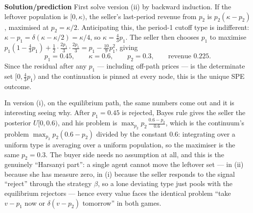 \documentclass[12pt]{article}
\begin{document}
\begin{center}
\end{center}


\textbf{Solution/prediction} 
First solve version (ii) by backward induction. If the leftover population is
$[0,\kappa)$, the seller's last-period revenue from $p_2$ is $p_2(\kappa - p_2)$, maximised at $p_2 = \kappa/2$. Anticipating this, the period-1 cutoff type is indifferent: $\kappa - p_1 = \delta(\kappa - \kappa/2) = \kappa/4$, so $\kappa = \tfrac43 p_1$. The seller then chooses $p_1$ to maximise $p_1(1 - \tfrac43 p_1) + \tfrac12 \cdot \tfrac{2p_1}{3}\cdot \tfrac{2p_1}{3} = p_1 - \tfrac{10}{9}p_1^2$, giving
\[ p_1 = 0.45, \qquad \kappa = 0.6, \qquad p_2 = 0.3, \qquad
\text{revenue } 0.225.
\]
Since the residual after any $p_1$ --- including off-path prices --- is the
determinate set $[0, \tfrac43 p_1)$ and the continuation is pinned at every
node, this is the unique SPE outcome.
 
In version (i), on the equilibrium path, the same numbers come out and it is
interesting seeing why. After $p_1 = 0.45$ is rejected, Bayes rule gives the seller
the posterior $U[0, 0.6)$, and his problem is $\max_{p_2} p_2\,\frac{0.6 - p_2}{0.6}$, which is the continuum's problem $\max_{p_2} p_2(0.6 - p_2)$ divided by the constant $0.6$: integrating over a uniform type is averaging over a uniform population, so the maximiser is the same $p_2 = 0.3$. The buyer side needs no assumption at all, and this is the genuinely ``Harsanyi part'': a single agent cannot move the leftover set --- in
(ii) because she has measure zero, in (i) because the seller responds to the
signal ``reject'' through the strategy $\beta$, so a lone deviating type just
pools with the equilibrium rejectors --- hence every value faces the identical
problem ``take $v - p_1$ now or $\delta(v - p_2)$ tomorrow'' in both games.
 
\end{document}
